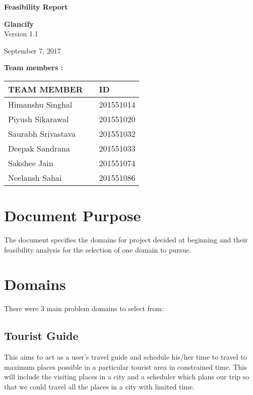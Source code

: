 \documentclass[12pt]{article}
\begin{document}
\begin{titlepage}
	\begin{center}
		
		\LARGE{\textbf{Feasibility Report}}
		        
		\vspace{1.5cm}
		      
		\textbf{Glancify} \\
		\small{Version 1.1}
		
					
		\vspace{5cm}
		        
						
		\large{September  7, 2017}
						
	\end{center}
\end{titlepage}
\newpage
\textbf{Team members :} \\
\begin{center}
	\begin{tabular}{ |m{10em} m{8em} m{9em}|}
		\hline
		TEAM MEMBER        &   & ID        \\
		\hline
		Himanshu Singhal             &   & 201551014 \\
	Piyush Sikarawal          &   & 201551020 \\
		Saurabh Srivastava              &   & 201551032 \\
	    Deepak Sandrana     &   & 201551033 \\
		Sakshee Jain    &   & 201551074 \\
		Neelansh Sahai    &   & 201551086 \\ 
		\hline
	\end{tabular}
	
\end{center}

	\newpage
	\tableofcontents
	\newpage
	
	\section{Document Purpose }
	 The document specifies the domains for project decided at beginning and their feasibility analysis for the selection of one domain to pursue.
    \section{Domains}
    There were 3 main problem domains to select from:
    \subsection{Tourist Guide}
    This aims to act as a user's travel guide and schedule his/her time to travel to maximum places possible in a particular tourist area in constrained time.
     This will include the visiting places in a city and a scheduler which plans our trip so that we could travel all the places in a city with limited time.
\end{document}
